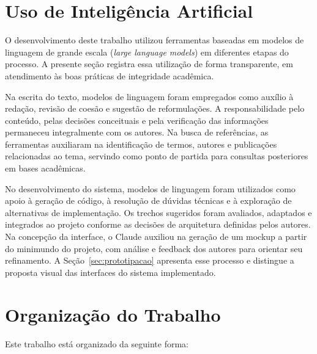 \section{Uso de Inteligência Artificial}\label{sec:uso_ia}

O desenvolvimento deste trabalho utilizou ferramentas baseadas em modelos de linguagem de grande escala (\textit{large language models}) em diferentes etapas do processo. A presente seção registra essa utilização de forma transparente, em atendimento às boas práticas de integridade acadêmica.

Na escrita do texto, modelos de linguagem foram empregados como auxílio à redação, revisão de coesão e sugestão de reformulações. A responsabilidade pelo conteúdo, pelas decisões conceituais e pela verificação das informações permaneceu integralmente com os autores. Na busca de referências, as ferramentas auxiliaram na identificação de termos, autores e publicações relacionadas ao tema, servindo como ponto de partida para consultas posteriores em bases acadêmicas.

No desenvolvimento do sistema, modelos de linguagem foram utilizados como apoio à geração de código, à resolução de dúvidas técnicas e à exploração de alternativas de implementação. Os trechos sugeridos foram avaliados, adaptados e integrados ao projeto conforme as decisões de arquitetura definidas pelos autores. Na concepção da interface, o Claude auxiliou na geração de um mockup a partir do minimundo do projeto, com análise e feedback dos autores para orientar seu refinamento. A Seção~\ref{sec:prototipacao} apresenta esse processo e distingue a proposta visual das interfaces do sistema implementado.

\section{Organização do Trabalho}

Este trabalho está organizado da seguinte forma:

